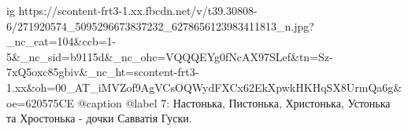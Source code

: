  
 
 
 
 

\ifcmt
  ig https://scontent-frt3-1.xx.fbcdn.net/v/t39.30808-6/271920574_5095296673837232_6278656123983411813_n.jpg?_nc_cat=104&ccb=1-5&_nc_sid=b9115d&_nc_ohc=VQQQEYg0fNcAX97SLef&tn=Sz-7xQ5oxc85gbiv&_nc_ht=scontent-frt3-1.xx&oh=00_AT_iMVZof9AgVCsOQWydFXCx62EkXpwkHKHqSX8UrmQa6g&oe=620575CE
  @caption @label 7: Настонька, Пистонька, Христонька, Устонька та Хростонька - дочки Савватія Гуски.
\fi
